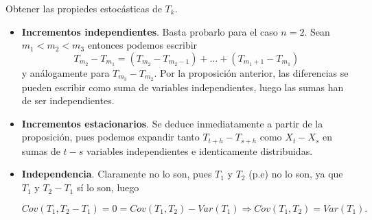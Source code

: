 \documentclass[PREyA.tex]{subfiles}
\begin{document}
\begin{example}
Obtener las propiedes estocásticas de $T_k$. 
\begin{itemize}
\item \textbf{Incrementos independientes}. Basta probarlo para el caso $n=2$. Sean $m_1 < m_2 < m_3$ entonces podemos escribir
$$
T_{m_2}- T_{m_1}  = (T_{m_2}- T_{m_2-1}) + … + (T_{m_{1}+1}- T_{m_1})
$$
y análogamente para $T_{m_3}- T_{m_2}$. Por la proposición anterior, las diferencias se pueden escribir como suma de variables independientes, luego las sumas han de ser independientes.

\item \textbf{Incrementos estacionarios}. Se deduce inmediatamente a partir de la proposición, pues podemos expandir tanto $T_{t+h}-T_{s+h}$ como $X_t - X_s$ en sumas de $t-s$ variables independientes e identicamente distribuidas.

\item \textbf{Independencia}. Claramente no lo son, pues $T_1$ y $T_2$ (p.e) no lo son, ya que $T_1$ y $T_2-T_1$ sí lo son, luego 

$$
Cov(T_1,T_2-T_1) = 0 = Cov(T_1,T_2) - Var(T_1) \Rightarrow Cov(T_1,T_2) = Var(T_1). 
$$


\end{itemize}
\end{example}
\end{document}
